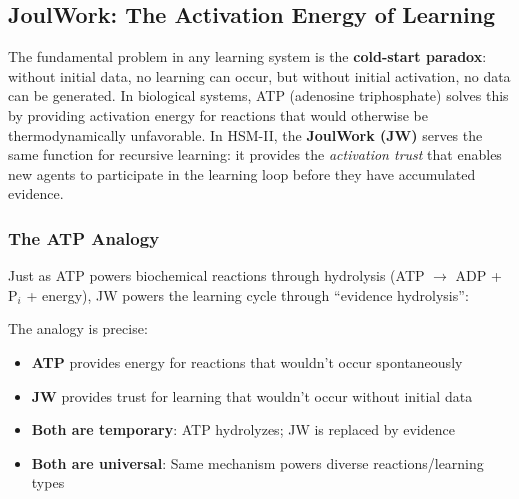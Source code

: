 \documentclass[11pt]{article}
\begin{document}
\subsection{JoulWork: The Activation Energy of Learning}

The fundamental problem in any learning system is the \textbf{cold-start
paradox}: without initial data, no learning can occur, but without initial
activation, no data can be generated. In biological systems, ATP (adenosine
triphosphate) solves this by providing activation energy for reactions that
would otherwise be thermodynamically unfavorable. In HSM-II, the
\textbf{JoulWork (JW)} serves the same function for recursive learning:
it provides the \textit{activation trust} that enables new agents to participate
in the learning loop before they have accumulated evidence.

\subsubsection{The ATP Analogy}

Just as ATP powers biochemical reactions through hydrolysis
(ATP $\rightarrow$ ADP + P$_i$ + energy), JW powers the learning cycle through
``evidence hydrolysis'':

\begin{center}
\end{center}

The analogy is precise:
\begin{itemize}[noitemsep,topsep=4pt]
  \item \textbf{ATP} provides energy for reactions that wouldn't occur spontaneously
  \item \textbf{JW} provides trust for learning that wouldn't occur without initial data
  \item \textbf{Both are temporary}: ATP hydrolyzes; JW is replaced by evidence
  \item \textbf{Both are universal}: Same mechanism powers diverse reactions/learning types
\end{itemize}
\end{document}
